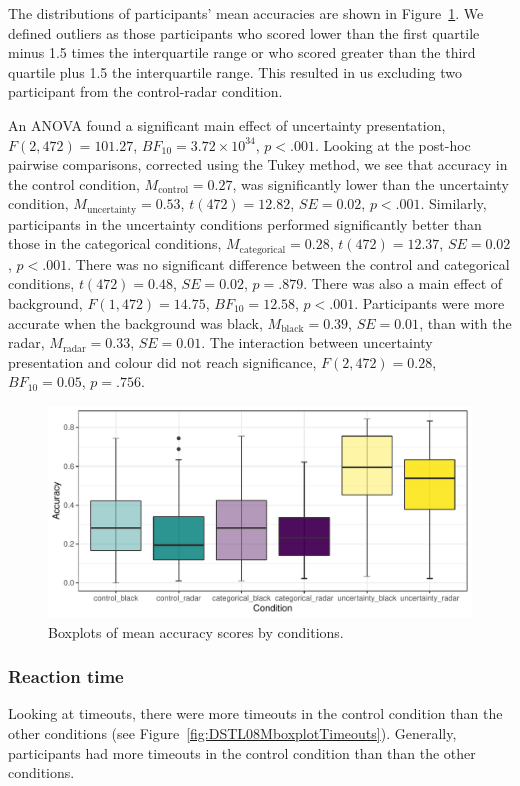\documentclass[doc, a4paper, apacite]{apa6}
\begin{document}
The distributions of participants' mean accuracies are shown in Figure~\ref{fig:DSTL08MboxplotAccuracy}. 
We defined outliers as those participants who scored lower than the first quartile minus 1.5 times the interquartile range or who scored greater than the third quartile plus 1.5 the interquartile range. 
This resulted in us excluding two participant from the control-radar condition. 

An ANOVA found a significant main effect of uncertainty presentation, $F(2,472)=101.27$, $BF_{10}=3.72 \times 10^{34}$, $p<.001$. 
Looking at the post-hoc pairwise comparisons, corrected using the Tukey method, we see that accuracy in the control condition, $M_\text{control}=0.27$, was significantly lower than the uncertainty condition, $M_\text{uncertainty}=0.53$, $t(472)=12.82$, $SE=0.02$, $p<.001$.
Similarly,  participants in the uncertainty conditions performed significantly better than those in the categorical conditions, $M_\text{categorical}=0.28$, $t(472)=12.37$, $SE=0.02$, $p<.001$. 
There was no significant difference between the control and categorical conditions,  $t(472)=0.48$, $SE=0.02$, $p=.879$. 
There was also a main effect of background, $F(1, 472)= 14.75$, $BF_{10}=12.58$, $p<.001$.
Participants were more accurate when the background was black, $M_\text{black}=0.39$, $SE=0.01$, than with the radar, $M_\text{radar}=0.33$, $SE=0.01$. 
The interaction between uncertainty presentation and colour did not reach significance, $F(2, 472)=0.28$, $BF_{10}=0.05$, $p=.756$. 

\begin{figure}[t!]
	\centering
	\includegraphics[width=\textwidth]{images/DSTL08MboxplotAccuracy}
	\caption{Boxplots of mean accuracy scores by conditions. }
	\label{fig:DSTL08MboxplotAccuracy}
\end{figure}

\subsubsection{Reaction time} 
Looking at timeouts, there were more timeouts in the control condition than the other conditions (see Figure~\ref{fig:DSTL08MboxplotTimeouts}).
Generally, participants had more timeouts in the control condition than than the other conditions. 
\end{document}
